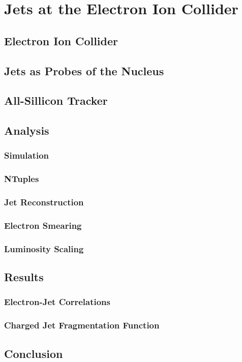 \chapter{Jets at the Electron Ion Collider}
\section{Electron Ion Collider}
\section{Jets as Probes of the Nucleus}
\section{All-Sillicon Tracker}
\section{Analysis}
\subsection{Simulation}
\subsection{NTuples}
\subsection{Jet Reconstruction}
\subsection{Electron Smearing}
\subsection{Luminosity Scaling}
\section{Results}
\subsection{Electron-Jet Correlations}
\subsection{Charged Jet Fragmentation Function}
\section{Conclusion}
